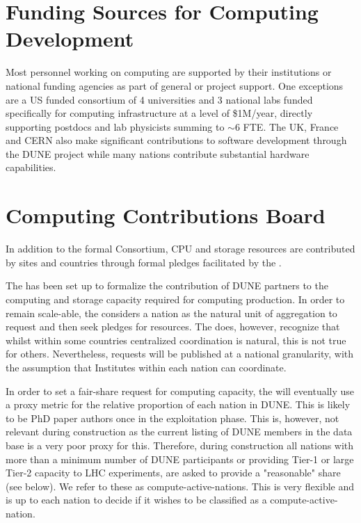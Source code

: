 \documentclass[../main-v1.tex]{subfiles}
\begin{document}
\section{Funding Sources for Computing Development}
Most personnel working on  computing are supported by their institutions or national funding agencies as part of general or  project support.  One exceptions are a US  funded consortium of 4 universities and 3 national labs funded specifically for  computing infrastructure at a level of \$1M/year, directly supporting postdocs and lab physicists summing to $\sim 6$ FTE.  The UK,  France and CERN also make significant contributions to software development through the DUNE project while many nations contribute substantial hardware capabilities. 



\section{Computing Contributions Board }\label{sec:ccb}

In addition to the formal Consortium, CPU and storage resources are contributed by sites and countries through formal pledges facilitated by the . 

The  has been set up to formalize the contribution of DUNE partners to the computing and storage capacity required for computing production. In order to remain scale-able, the  considers a nation as the natural unit of aggregation to request and then seek pledges for resources. The  does, however, recognize that whilst within some countries centralized coordination is natural, this is not true for others. Nevertheless, requests will be published at a national granularity, with the assumption that Institutes within each nation can coordinate.

In order to set a fair-share request for computing capacity, the  will eventually use a proxy metric for the relative proportion of each nation in DUNE. This is likely to be PhD paper authors once in the exploitation phase. This is, however, not relevant during construction as the current listing of DUNE members in the data base is a very poor proxy for this. Therefore, during construction all nations with more than a minimum number of DUNE participants or providing Tier-1 or large Tier-2 capacity to LHC experiments, are asked to provide a "reasonable" share (see below). We refer to these as compute-active-nations.
This is very flexible and is up to each nation to decide if it wishes to be classified as a compute-active-nation.
\end{document}
